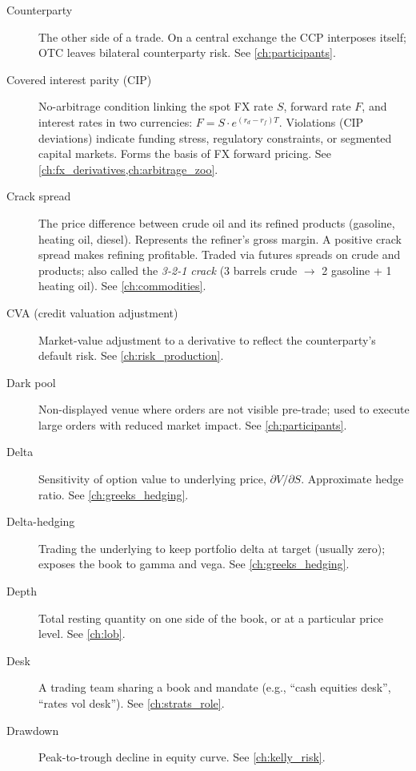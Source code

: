 \begin{description}
\item[Counterparty]
The other side of a trade. On a central exchange the CCP interposes
itself; OTC leaves bilateral counterparty risk. See \cref{ch:participants}.

\item[Covered interest parity (CIP)]
No-arbitrage condition linking the spot FX rate $S$, forward rate $F$,
and interest rates in two currencies: $F = S\cdot e^{(r_d - r_f)T}$.
Violations (CIP deviations) indicate funding stress, regulatory
constraints, or segmented capital markets. Forms the basis of FX
forward pricing. See \cref{ch:fx_derivatives,ch:arbitrage_zoo}.

\item[Crack spread]
The price difference between crude oil and its refined products
(gasoline, heating oil, diesel). Represents the refiner's gross
margin. A positive crack spread makes refining profitable. Traded
via futures spreads on crude and products; also called the \emph{3-2-1
crack} (3 barrels crude $\to$ 2 gasoline + 1 heating oil).
See \cref{ch:commodities}.

\item[CVA (credit valuation adjustment)]
Market-value adjustment to a derivative to reflect the counterparty's
default risk. See \cref{ch:risk_production}.

\item[Dark pool]
Non-displayed venue where orders are not visible pre-trade; used to
execute large orders with reduced market impact. See \cref{ch:participants}.

\item[Delta]
Sensitivity of option value to underlying price, $\partial V/\partial
S$. Approximate hedge ratio. See \cref{ch:greeks_hedging}.

\item[Delta-hedging]
Trading the underlying to keep portfolio delta at target (usually
zero); exposes the book to gamma and vega. See \cref{ch:greeks_hedging}.

\item[Depth]
Total resting quantity on one side of the book, or at a particular
price level. See \cref{ch:lob}.

\item[Desk]
A trading team sharing a book and mandate (e.g., ``cash equities
desk'', ``rates vol desk''). See \cref{ch:strats_role}.

\item[Drawdown]
Peak-to-trough decline in equity curve. See \cref{ch:kelly_risk}.


\end{description}
